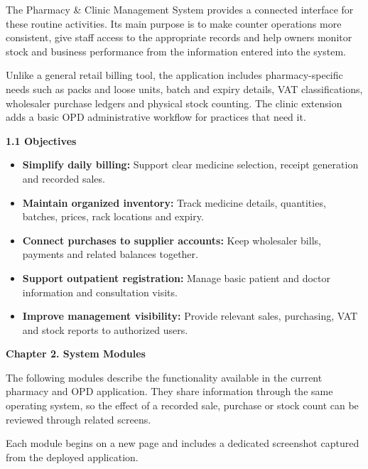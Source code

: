 \documentclass[11pt,a4paper]{article}
\newcommand{\chaptertitle}[1]{%
    \vspace*{0.2cm}%
    {\normalfont\LARGE\bfseries\color{HeaderNavy} #1}%
    \vspace*{0.3cm}\par%
}
\newcommand{\subheading}[1]{%
    \vspace*{0.2cm}%
    {\normalfont\large\bfseries\color{SubHeader} #1}%
    \vspace*{0.15cm}\par%
}
\begin{document}
The Pharmacy \& Clinic Management System provides a connected interface for these routine activities. Its main purpose is to make counter operations more consistent, give staff access to the appropriate records and help owners monitor stock and business performance from the information entered into the system.

Unlike a general retail billing tool, the application includes pharmacy-specific needs such as packs and loose units, batch and expiry details, VAT classifications, wholesaler purchase ledgers and physical stock counting. The clinic extension adds a basic OPD administrative workflow for practices that need it.

\subheading{1.1 Objectives}
\begin{itemize}
    \item \textbf{Simplify daily billing:} Support clear medicine selection, receipt generation and recorded sales.
    \item \textbf{Maintain organized inventory:} Track medicine details, quantities, batches, prices, rack locations and expiry.
    \item \textbf{Connect purchases to supplier accounts:} Keep wholesaler bills, payments and related balances together.
    \item \textbf{Support outpatient registration:} Manage basic patient and doctor information and consultation visits.
    \item \textbf{Improve management visibility:} Provide relevant sales, purchasing, VAT and stock reports to authorized users.
\end{itemize}

\newpage
\chaptertitle{Chapter 2. System Modules}

The following modules describe the functionality available in the current pharmacy and OPD application. They share information through the same operating system, so the effect of a recorded sale, purchase or stock count can be reviewed through related screens.

Each module begins on a new page and includes a dedicated screenshot captured from the deployed application.
\end{document}
